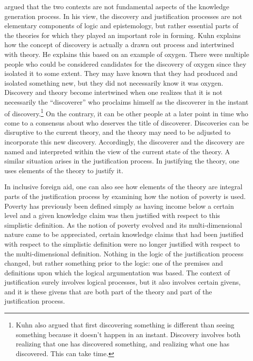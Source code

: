 \documentclass[a4paper]{article}
\begin{document}
\cite{kuhn1970structure} argued that the two contexts are not fundamental
aspects of the knowledge generation process. In his view, the discovery and
justification processes are not elementary components of logic and
epistemology, but rather essential parts of the theories for which they played
an important role in forming. Kuhn explains how the concept of discovery is
actually a drawn out process and intertwined with theory. He explains this
based on an example of oxygen. There were multiple people who could be
considered candidates for the discovery of oxygen since they isolated it to
some extent. They may have known that they had produced and isolated something
new, but they did not necessarily know it was oxygen. Discovery and theory
become intertwined when one realizes that it is not necessarily the
``discoverer'' who proclaims himself as the discoverer in the instant of
discovery.\footnote{Kuhn also argued that first discovering something is
different than seeing something because it doesn't happen in an instant.
Discovery involves both realizing that one has discovered something, and
realizing what one has discovered. This can take time.} On the contrary, it
can be other people at a later point in time who come to a consensus about who
deserves the title of discoverer. Discoveries can be disruptive to the current
theory, and the theory may need to be adjusted to incorporate this new
discovery. Accordingly, the discoverer and the discovery are named and
interpreted within the view of the current state of the theory. A similar
situation arises in the justification process. In justifying the theory, one
uses elements of the theory to justify it.

In inclusive foreign aid, one can also see how elements of the theory are
integral parts of the justification process by examining how the notion of
poverty is used. Poverty has previously been defined simply as having income
below a certain level and a given knowledge claim was then justified with
respect to this simplistic definition. As the notion of poverty evolved and
its multi-dimensional nature came to be appreciated, certain knowledge claims
that had been justified with respect to the simplistic definition were no
longer justified with respect to the multi-dimensional definition. Nothing in
the logic of the justification process changed, but rather something prior to
the logic: one of the premises and definitions upon which the logical
argumentation was based. The context of justification surely involves logical
processes, but it also involves certain givens, and it is these givens that
are both part of the theory and part of the justification process.
\end{document}
